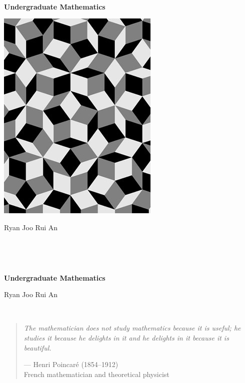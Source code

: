 \begin{center}
\

\vspace{2cm}

{\fontsize{40}{0}\sffamily\bfseries Undergraduate Mathematics}

\vspace{2cm}

\includegraphics[width=0.6\linewidth]{images/penrose-bnw.jpg}

\vspace{2cm}

{\Huge Ryan Joo Rui An}
\nbvspace[1]
\end{center}

\thispagestyle{empty}
\pagebreak

\

\thispagestyle{empty}
\pagebreak

\begin{center}
\

\vspace{6cm}

{\huge\bfseries Undergraduate Mathematics}

\vspace{2cm}

{\huge Ryan Joo Rui An}
\end{center}
\thispagestyle{empty}
\pagebreak

\thispagestyle{empty}
\

\vfill

\begin{quote}
\textit{The mathematician does not study mathematics because it is useful; he studies it because he delights in it and he delights in it because it is beautiful.}

\begin{flushright}--- Henri Poincar\'{e} (1854--1912)\\
French mathematician and theoretical physicist\end{flushright}
\end{quote}

